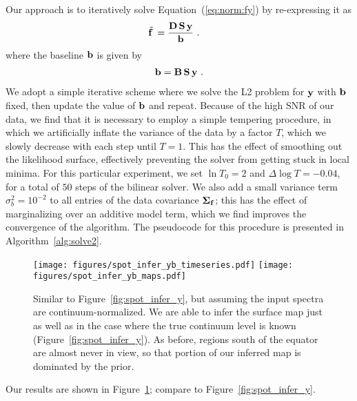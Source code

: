 \documentclass[modern]{aastex631}
\begin{document}
Our approach is to iteratively solve Equation~(\ref{eq:norm:fy}) by re-expressing it as
%
\begin{align}
    \tilde{{\mathbf{f}}\hspace{0.2em}}
     & =
    \frac{
        {\mathbf{D}}
        \,
        {\mathbf{S}}
        \,
        {\mathbf{y}}
    }{
        {\mathbf{b}}
    }
    \hskip 0.33em.
\end{align}
%
where the baseline ${\mathbf{b}}$ is given by
%
\begin{align}
    {\ensuremath{\mathbf{b}}}
    =
    {\mathbf{B}}
    \,
    {\mathbf{S}}
    \,
    {\mathbf{y}}
    \hskip 0.33em.
\end{align}
%
We adopt a simple iterative scheme where we solve the L2 problem for ${\mathbf{y}}$ with ${\mathbf{b}}$ fixed, then update the value of ${\mathbf{b}}$ and repeat.
Because of the high SNR of our data, we find that it is necessary to employ a simple tempering procedure, in which we artificially inflate the variance of the data by a factor $T$, which we slowly decrease with each step until $T = 1$. 
This has the effect of smoothing out the likelihood surface, effectively preventing the solver from getting stuck in local minima.
For this particular experiment, we set $\ln T_0 = 2$ and $\Delta \log T = -0.04$, for a total of $50$ steps of the bilinear solver.
We also add a small variance term $\sigma_b^2 = 10^{-2}$ to all entries of the data covariance $\boldsymbol{\Sigma}_{{\mathbf{f}}}$; this has the effect of marginalizing over an additive model term, which we find improves the convergence of the algorithm.
The pseudocode for this procedure is presented in Algorithm~\ref{alg:solve2}.

\begin{figure}[p!]
    \begin{centering}
        \texttt{[image: figures/spot\_infer\_yb\_timeseries.pdf]}
        \texttt{[image: figures/spot\_infer\_yb\_maps.pdf]}
        \caption{%
            Similar to Figure~\ref{fig:spot_infer_y}, but assuming the input spectra are continuum-normalized.
            We are able to infer the surface map just as
            well as in the case where the true continuum level
            is known (Figure~\ref{fig:spot_infer_y}). As before,
            regions south of the equator are almost never in view, so that portion of our inferred map is dominated by the prior.
        }
        \label{fig:spot_infer_yb}
    \end{centering}
\end{figure}

Our results are shown in Figure~\ref{fig:spot_infer_yb}; compare to Figure~\ref{fig:spot_infer_y}.
\end{document}

